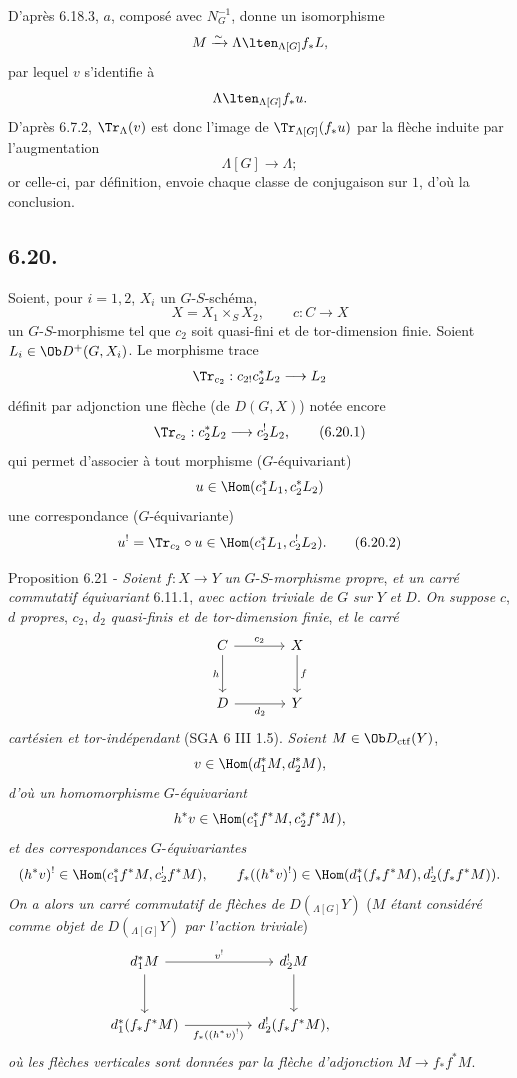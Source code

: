 D'après 6.18.3, $a$,
composé avec $N_G^{-1}$, donne un isomorphisme
\[
M\xrightarrow{\sim}\Lambda\lten_{\Lambda[G]}f_*L,
\]
par lequel $v$ s'identifie à
\[
\Lambda\lten_{\Lambda[G]}f_*u.
\]
D'après 6.7.2, $\Tr_{\Lambda}(v)$ est donc l'image de $\Tr_{\Lambda[G]}(f_*u)$ par la flèche induite par l'augmentation
\[
\Lambda[G]\longrightarrow \Lambda;
\]
or celle-ci, par définition, envoie chaque classe de conjugaison sur $1$, d'où la conclusion.

\subsection*{6.20.}
Soient, pour $i=1,2$, $X_i$ un $G$-$S$-schéma,
\[
X=X_1\times_SX_2,\qquad c:C\to X
\]
un $G$-$S$-morphisme tel que $c_2$ soit quasi-fini et de tor-dimension finie. Soient $L_i\in\Ob D^+(G,X_i)$. Le morphisme trace
\[
\Tr_{c_2}:c_{2!}c_2^*L_2\longrightarrow L_2
\]
définit par adjonction une flèche (de $D(G,X)$) notée encore
\begin{equation}
\Tr_{c_2}:c_2^*L_2\longrightarrow c_2^!L_2,
\tag{6.20.1}
\end{equation}
qui permet d'associer à tout morphisme ($G$-équivariant)
\[
u\in\Hom(c_1^*L_1,c_2^*L_2)
\]
une correspondance ($G$-équivariante)
\begin{equation}
u^! = \Tr_{c_2}\circ u\in\Hom(c_1^*L_1,c_2^!L_2).
\tag{6.20.2}
\end{equation}

\begin{statement}{Proposition 6.21 -}
\emph{Soient} $f:X\to Y$ \emph{un} $G$-$S$-\emph{morphisme propre}, \emph{et un carré commutatif équivariant} 6.11.1, \emph{avec action triviale de} $G$ \emph{sur} $Y$ \emph{et} $D$. \emph{On suppose} $c$, $d$ \emph{propres}, $c_2$, $d_2$ \emph{quasi-finis et de tor-dimension finie}, \emph{et le carré}
\[
\begin{tikzcd}[column sep=large,row sep=large]
C \arrow[r,"c_2"] \arrow[d,"h"'] & X \arrow[d,"f"]\\
D \arrow[r,"d_2"'] & Y
\end{tikzcd}
\]
\emph{cartésien et tor-indépendant} (SGA 6 III 1.5). \emph{Soient} $M\in\Ob D_{\mathrm{ctf}}(Y)$,
\[
v\in\Hom(d_1^*M,d_2^*M),
\]
\emph{d'où un homomorphisme} $G$-\emph{équivariant}
\[
h^*v\in\Hom(c_1^*f^*M,c_2^*f^*M),
\]
\emph{et des correspondances} $G$-\emph{équivariantes}
\[
(h^*v)^!\in\Hom(c_1^*f^*M,c_2^!f^*M),
\qquad
f_*((h^*v)^!)\in\Hom(d_1^*(f_*f^*M),d_2^!(f_*f^*M)).
\]
\emph{On a alors un carré commutatif de flèches de} $D({}_{\Lambda[G]}Y)$ ($M$ \emph{étant considéré comme objet de} $D({}_{\Lambda[G]}Y)$ \emph{par l'action triviale})
\[
\begin{tikzcd}[column sep=huge,row sep=large]
d_1^*M \arrow[r,"v^!"] \arrow[d] & d_2^!M \arrow[d] & {}\\
d_1^*(f_*f^*M) \arrow[r,"f_*((h^*v)^!)"'] & d_2^!(f_*f^*M),
\end{tikzcd}
\]
\emph{où les
flèches verticales sont données par la flèche d'adjonction} $M\to f_*f^*M$.
\end{statement}

